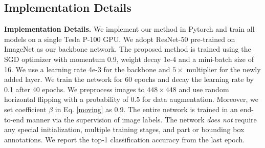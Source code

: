 \documentclass[journal]{IEEEtran}
\begin{document}
\subsection{Implementation Details}
\textbf{Implementation Details.}
We implement our method in Pytorch \cite{paszke2017automatic} and train all models on a single Tesla P-100 GPU. We adopt ResNet-50 \cite{he2016deep} pre-trained on ImageNet \cite{deng2009imagenet} as our backbone network.
The proposed method is trained using the SGD optimizer with momentum 0.9, weight decay 1e-4 and a mini-batch size of 16. We use a learning rate 4e-3 for the backbone and $5\times$ multiplier for the newly added layer. 
We train the network for 60 epochs and decay the learning rate by 0.1 after 40 epochs.
We preprocess images to $448 \times 448$ and use random horizontal flipping with a probability of $0.5$ for data augmentation. Moreover, we set coefficient $\beta$ in Eq. \ref{moving} as 0.9. 
The entire network is trained in an end-to-end manner via the supervision of image labels. The network \emph{does not} require any special initialization, multiple training stages, and part or bounding box annotations. We report the top-1 classification accuracy from the last epoch.
\end{document}
